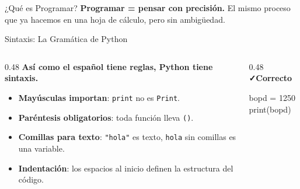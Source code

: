 \documentclass[aspectratio=169, 11pt]{beamer}
\begin{document}
\begin{frame}{¿Qué es Programar?}
  \vspace{4pt}
  {\footnotesize\color{arcaDark}
    \textbf{Programar = pensar con precisión.}
    El mismo proceso que ya hacemos en una hoja de cálculo, pero sin ambigüedad.}
\end{frame}

\begin{frame}[fragile]{Sintaxis: La Gramática de Python}
  \vspace{-6pt}
  \begin{columns}[T]
    \begin{column}{0.48\textwidth}
      {\small\color{arcaDark}\bfseries
        Así como el español tiene reglas,
        Python tiene \textbf{sintaxis}.}

      \vspace{4pt}
      {\footnotesize\color{textMuted}
      \begin{itemize}\setlength{\itemsep}{3pt}
        \item[{\color{arcaRed}\scriptsize\faFont}]
          \textbf{Mayúsculas importan}: \texttt{print} no es \texttt{Print}.

        \item[{\color{arcaRed}\scriptsize\faCode}]
          \textbf{Paréntesis obligatorios}: toda función
          lleva \texttt{()}.

        \item[{\color{arcaRed}\scriptsize\faQuoteRight}]
          \textbf{Comillas para texto}: \texttt{"hola"} es texto,
          \texttt{hola} sin comillas es una variable.

        \item[{\color{arcaRed}\scriptsize\faIndent}]
          \textbf{Indentación}: los espacios al inicio
          definen la estructura del código.
      \end{itemize}
      }
    \end{column}

    \begin{column}{0.48\textwidth}
      {\small\color{codeGreen}\bfseries\faCheck\hspace{4pt}Correcto}
      \begin{tcolorbox}[
        colback=arcaGray, colframe=codeGreen, boxrule=0pt, leftrule=3pt,
        arc=2pt, left=5pt, right=5pt, top=3pt, bottom=3pt
      ]
        {\scriptsize\ttfamily\color{textDark}
        bopd = 1250\\
        print(bopd)}
      \end{tcolorbox}


\end{column}
\end{columns}
\end{frame}
\end{document}
